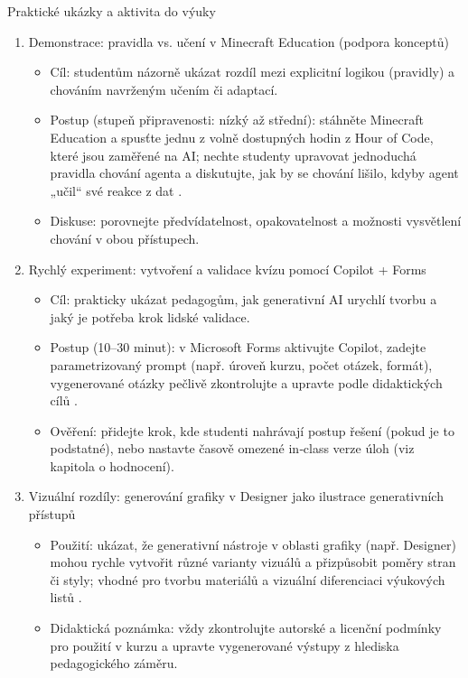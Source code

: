 \documentclass{report}%
\begin{document}
Praktické ukázky a aktivita do výuky
\begin{enumerate}
  \item Demonstrace: pravidla vs. učení v Minecraft Education (podpora konceptů)
    \begin{itemize}
      \item Cíl: studentům názorně ukázat rozdíl mezi explicitní logikou (pravidly) a chováním navrženým učením či adaptací.
      \item Postup (stupeň připravenosti: nízký až střední): stáhněte Minecraft Education a spusťte jednu z volně dostupných hodin z Hour of Code, které jsou zaměřené na AI; nechte studenty upravovat jednoduchá pravidla chování agenta a diskutujte, jak by se chování lišilo, kdyby agent „učil“ své reakce z dat \cite{kb_ai_101_tipu_pdf_04e4a115_page_15_2}.
      \item Diskuse: porovnejte předvídatelnost, opakovatelnost a možnosti vysvětlení chování v obou přístupech.
    \end{itemize}

  \item Rychlý experiment: vytvoření a validace kvízu pomocí Copilot + Forms
    \begin{itemize}
      \item Cíl: prakticky ukázat pedagogům, jak generativní AI urychlí tvorbu a jaký je potřeba krok lidské validace.
      \item Postup (10–30 minut): v Microsoft Forms aktivujte Copilot, zadejte parametrizovaný prompt (např. úroveň kurzu, počet otázek, formát), vygenerované otázky pečlivě zkontrolujte a upravte podle didaktických cílů \cite{kb_ai_101_tipu_pdf_04e4a115_page_8_1}.
      \item Ověření: přidejte krok, kde studenti nahrávají postup řešení (pokud je to podstatné), nebo nastavte časově omezené in‑class verze úloh (viz kapitola o hodnocení).
    \end{itemize}

  \item Vizuální rozdíly: generování grafiky v Designer jako ilustrace generativních přístupů
    \begin{itemize}
      \item Použití: ukázat, že generativní nástroje v oblasti grafiky (např. Designer) mohou rychle vytvořit různé varianty vizuálů a přizpůsobit poměry stran či styly; vhodné pro tvorbu materiálů a vizuální diferenciaci výukových listů \cite{kb_ai_101_tipu_pdf_04e4a115_page_51_1}.
      \item Didaktická poznámka: vždy zkontrolujte autorské a licenční podmínky pro použití v kurzu a upravte vygenerované výstupy z hlediska pedagogického záměru.
    \end{itemize}
\end{enumerate}
\end{document}
